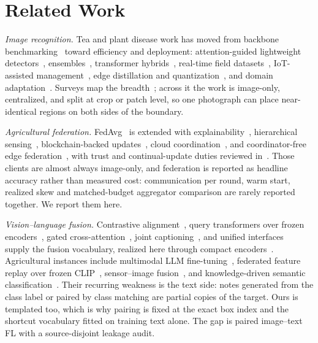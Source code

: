 \documentclass[conference]{IEEEtran}
\begin{document}
\section{Related Work}
\label{sec:related}

\emph{Image recognition.} Tea and plant disease work has moved from backbone
benchmarking~\cite{DengPhotong2024,He2016ResNet} toward efficiency and
deployment: attention-guided lightweight
detectors~\cite{Yang2025WaveLite,Ji2024TAFE,Cao2025GAFNet},
ensembles~\cite{PlantDet2023IEEEAccess,Maurya2024IEEEAccess}, transformer
hybrids~\cite{Thakur2024TAFE,Das2025RiceBlast}, real-time field
datasets~\cite{Joseph2024IEEEAccess}, IoT-assisted
management~\cite{AlShahari2025IEEEAccess}, edge distillation and
quantization~\cite{Tong2026TinyPMDet,Padeiro2026SPQ}, and domain
adaptation~\cite{Qadri2026DDAN,Nadeem2026CCUDA}. Surveys map the
breadth~\cite{Shafik2023IEEEAccess,Hu2024CropProtection}; across it the work is
image-only, centralized, and split at crop or patch level, so one photograph can
place near-identical regions on both sides of the boundary.

\emph{Agricultural federation.} FedAvg~\cite{McMahan2017} is extended with
explainability~\cite{Tahir2025FedXAI}, hierarchical
sensing~\cite{Devaraj2024RuralAI}, blockchain-backed
updates~\cite{Ding2025Bc2FL}, cloud coordination~\cite{Caminha2024CloudFL}, and
coordinator-free edge federation~\cite{Kundjanasith2023DFL}, with trust and
continual-update duties reviewed
in~\cite{Baee2025Trustworthy,Dimitri2026Continual}. Those clients are almost
always image-only, and federation is reported as headline accuracy rather than
measured cost: communication per round, warm start, realized skew and
matched-budget aggregator comparison are rarely reported together. We report
them here.

\emph{Vision--language fusion.} Contrastive alignment~\cite{Radford2021}, query
transformers over frozen encoders~\cite{Li2023}, gated
cross-attention~\cite{Alayrac2022}, joint captioning~\cite{Yu2022}, and unified
interfaces~\cite{Lu2022} supply the fusion vocabulary, realized here through
compact encoders~\cite{Sanh2019,Turc2019WellRead,Dosovitskiy2021,Touvron2021,Liu2021Swin,Liu2022ConvNeXT,Tan2019}.
Agricultural instances include multimodal LLM
fine-tuning~\cite{Wang2025LLMICDP}, federated feature replay over frozen
CLIP~\cite{Li2025FedReplay}, sensor--image fusion~\cite{Garg2025Multimodal}, and
knowledge-driven semantic classification~\cite{Kethineni2025Semantic}. Their recurring
weakness is the text side: notes generated from the class label or paired by
class matching are partial copies of the target. Ours is templated too, which is
why pairing is fixed at the exact box index and the shortcut vocabulary fitted on
training text alone. The gap is paired image--text FL with a source-disjoint
leakage audit.
\end{document}

